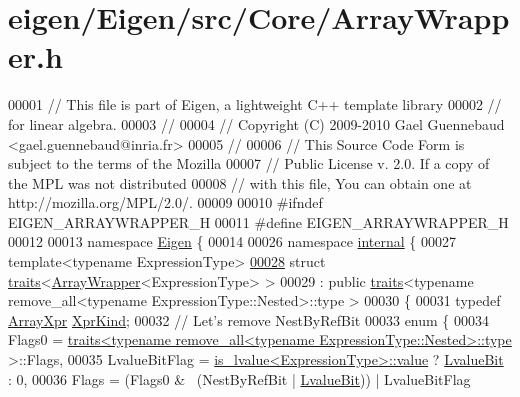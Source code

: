 \hypertarget{eigen_2_eigen_2src_2_core_2_array_wrapper_8h_source}{}\section{eigen/\+Eigen/src/\+Core/\+Array\+Wrapper.h}
\label{eigen_2_eigen_2src_2_core_2_array_wrapper_8h_source}

\begin{DoxyCode}
00001 \textcolor{comment}{// This file is part of Eigen, a lightweight C++ template library}
00002 \textcolor{comment}{// for linear algebra.}
00003 \textcolor{comment}{//}
00004 \textcolor{comment}{// Copyright (C) 2009-2010 Gael Guennebaud <gael.guennebaud@inria.fr>}
00005 \textcolor{comment}{//}
00006 \textcolor{comment}{// This Source Code Form is subject to the terms of the Mozilla}
00007 \textcolor{comment}{// Public License v. 2.0. If a copy of the MPL was not distributed}
00008 \textcolor{comment}{// with this file, You can obtain one at http://mozilla.org/MPL/2.0/.}
00009 
00010 \textcolor{preprocessor}{#ifndef EIGEN\_ARRAYWRAPPER\_H}
00011 \textcolor{preprocessor}{#define EIGEN\_ARRAYWRAPPER\_H}
00012 
00013 \textcolor{keyword}{namespace }\hyperlink{namespace_eigen}{Eigen} \{ 
00014 
00026 \textcolor{keyword}{namespace }\hyperlink{namespaceinternal}{internal} \{
00027 \textcolor{keyword}{template}<\textcolor{keyword}{typename} ExpressionType>
\hyperlink{struct_eigen_1_1internal_1_1traits_3_01_array_wrapper_3_01_expression_type_01_4_01_4}{00028} \textcolor{keyword}{struct }\hyperlink{struct_eigen_1_1internal_1_1traits}{traits}<\hyperlink{group___core___module_class_eigen_1_1_array_wrapper}{ArrayWrapper}<ExpressionType> >
00029   : \textcolor{keyword}{public} \hyperlink{struct_eigen_1_1internal_1_1traits}{traits}<typename remove\_all<typename ExpressionType::Nested>::type >
00030 \{
00031   \textcolor{keyword}{typedef} \hyperlink{struct_eigen_1_1_array_xpr}{ArrayXpr} \hyperlink{struct_eigen_1_1_array_xpr}{XprKind};
00032   \textcolor{comment}{// Let's remove NestByRefBit}
00033   \textcolor{keyword}{enum} \{
00034     Flags0 = \hyperlink{struct_eigen_1_1internal_1_1traits}{traits<typename remove\_all<typename ExpressionType::Nested>::type}
       >::Flags,
00035     LvalueBitFlag = \hyperlink{struct_eigen_1_1internal_1_1is__lvalue}{is\_lvalue<ExpressionType>::value} ? 
      \hyperlink{group__flags_gae2c323957f20dfdc6cb8f44428eaec1a}{LvalueBit} : 0,
00036     Flags = (Flags0 & ~(NestByRefBit | \hyperlink{group__flags_gae2c323957f20dfdc6cb8f44428eaec1a}{LvalueBit})) | LvalueBitFlag

\end{DoxyCode}

